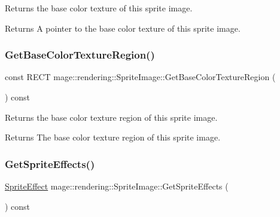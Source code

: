 Returns the base color texture of this sprite image.

\begin{DoxyReturn}{Returns}
A pointer to the base color texture of this sprite image. 
\end{DoxyReturn}
\hypertarget{classmage_1_1rendering_1_1_sprite_image_ae8d120b87e4791cf85799623ae554f41}{}\label{classmage_1_1rendering_1_1_sprite_image_ae8d120b87e4791cf85799623ae554f41} 
\subsubsection{\texorpdfstring{Get\+Base\+Color\+Texture\+Region()}{GetBaseColorTextureRegion()}}
{\footnotesize\ttfamily const R\+E\+CT mage\+::rendering\+::\+Sprite\+Image\+::\+Get\+Base\+Color\+Texture\+Region (\begin{DoxyParamCaption}{ }\end{DoxyParamCaption}) const\hspace{0.3cm}{\ttfamily [noexcept]}}

Returns the base color texture region of this sprite image.

\begin{DoxyReturn}{Returns}
The base color texture region of this sprite image. 
\end{DoxyReturn}
\hypertarget{classmage_1_1rendering_1_1_sprite_image_a82a804fe9ed8c685268a1a42ab853eb4}{}\label{classmage_1_1rendering_1_1_sprite_image_a82a804fe9ed8c685268a1a42ab853eb4} 
\subsubsection{\texorpdfstring{Get\+Sprite\+Effects()}{GetSpriteEffects()}}
{\footnotesize\ttfamily \hyperlink{namespacemage_1_1rendering_a4dbc3536c87b906f1d41d863ec458e78}{Sprite\+Effect} mage\+::rendering\+::\+Sprite\+Image\+::\+Get\+Sprite\+Effects (\begin{DoxyParamCaption}{ }\end{DoxyParamCaption}) const\hspace{0.3cm}{\ttfamily [noexcept]}}

